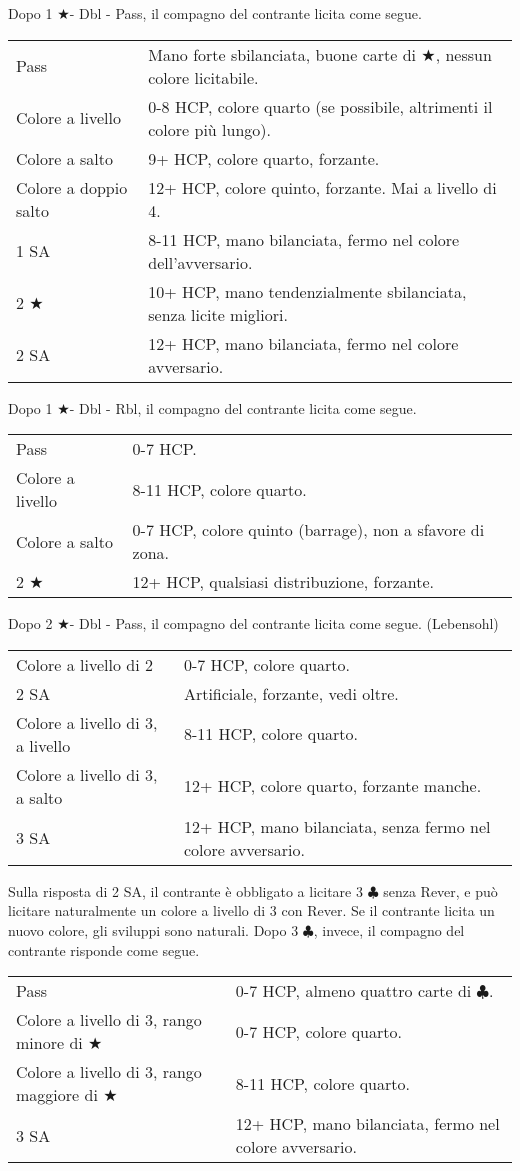 \documentclass[a4paper,10pt]{article}
\renewcommand{\c}{$\clubsuit$\xspace}
\renewcommand{\j}{$\bigstar$\xspace}
\newcommand{\sa}{SA\xspace}
\newcommand{\smallspace}{\vskip0.3cm}
\newenvironment{twocol}
  {\smallspace\noindent\begin{tabular}{l p{0.78\textwidth}}}
  {\end{tabular}\smallspace}
\begin{document}
Dopo 1 \j \xspace- Dbl - Pass, il compagno del contrante licita come segue.

\begin{twocol}
	Pass & Mano forte sbilanciata, buone carte di \j, nessun colore licitabile. \\
	Colore a livello & 0-8 HCP, colore quarto (se possibile, altrimenti il colore più lungo). \\
	Colore a salto & 9+ HCP, colore quarto, forzante. \\
	Colore a doppio salto & 12+ HCP, colore quinto, forzante. Mai a livello di 4. \\
	1 \sa & 8-11 HCP, mano bilanciata, fermo nel colore dell'avversario. \\
	2 \j & 10+ HCP, mano tendenzialmente sbilanciata, senza licite migliori. \\
	2 \sa & 12+ HCP, mano bilanciata, fermo nel colore avversario. \\
\end{twocol}

Dopo 1 \j \xspace- Dbl - Rbl, il compagno del contrante licita come segue.

\begin{twocol}
	Pass & 0-7 HCP. \\
	Colore a livello & 8-11 HCP, colore quarto. \\
	Colore a salto & 0-7 HCP, colore quinto (barrage), non a sfavore di zona. \\
	2 \j & 12+ HCP, qualsiasi distribuzione, forzante. \\
\end{twocol}

Dopo 2 \j \xspace- Dbl - Pass, il compagno del contrante licita come segue. (Lebensohl)

\begin{twocol}
	Colore a livello di 2 & 0-7 HCP, colore quarto. \\
	2 \sa & Artificiale, forzante, vedi oltre. \\
	Colore a livello di 3, a livello & 8-11 HCP, colore quarto. \\
	Colore a livello di 3, a salto & 12+ HCP, colore quarto, forzante manche. \\
	3 \sa & 12+ HCP, mano bilanciata, senza fermo nel colore avversario.
\end{twocol}

Sulla risposta di 2 \sa, il contrante è obbligato a licitare 3 \c senza Rever, e può licitare naturalmente un colore a livello di 3 con Rever. Se il contrante licita un nuovo colore, gli sviluppi sono naturali. Dopo 3 \c, invece, il compagno del contrante risponde come segue.

\begin{twocol}
	Pass & 0-7 HCP, almeno quattro carte di \c. \\
	Colore a livello di 3, rango minore di \j & 0-7 HCP, colore quarto. \\
	Colore a livello di 3, rango maggiore di \j & 8-11 HCP, colore quarto. \\
	3 \sa & 12+ HCP, mano bilanciata, fermo nel colore avversario.
\end{twocol}
\end{document}
